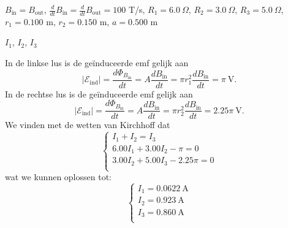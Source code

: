     \begin{description}[labelwidth=1.5cm, leftmargin=!]
        \item[Geg. :] $B_{\text{in}} = B_{\text{out}}$, $\frac{d}{dt} B_{\text{in}} = \frac{d}{dt} B_{\text{out}} = 100$ T/s, $R_1 = 6.0 \ \Omega$, $R_2 = 3.0 \ \Omega$, $R_3 = 5.0 \ \Omega$, $r_1 = 0.100$ m, $r_2 = 0.150$ m, $a = 0.500$ m
        \item[Gevr. :] $I_1$, $I_2$, $I_3$
        \item[Opl. :]
            In de linkse lus is de geïnduceerde emf gelijk aan
            \begin{equation*}
                \left| \mathcal{E}_{\text{ind}} \right| =  \frac{d\Phi_{B_{\text{in}}}}{dt} = A\frac{dB_{\text{in}}}{dt} = \pi r_1^2 \frac{dB_{\text{in}}}{dt}  = \pi \ \text{V}.
            \end{equation*}
            In de rechtse lus is de geïnduceerde emf gelijk aan
            \begin{equation*}
                \left| \mathcal{E}_{\text{ind}} \right| =  \frac{d\Phi_{B_{\text{in}}}}{dt} = A\frac{dB_{\text{in}}}{dt} = \pi r_2^2 \frac{dB_{\text{in}}}{dt}  = 2.25\pi \ \text{V}.
            \end{equation*}
            We vinden met de wetten van Kirchhoff dat
            \begin{equation*}
                \begin{cases}
                    I_1 + I_2 = I_3 \\
                    6.00I_1 + 3.00I_2 - \pi = 0 \\
                    3.00I_2 + 5.00I_3 - 2.25\pi = 0 \\
                \end{cases}
            \end{equation*} 
            wat we kunnen oplossen tot:
            \begin{equation*}
                \begin{cases}
                    I_1 = 0.0622 \ \text{A} \\
                    I_2 = 0.923 \ \text{A} \\
                    I_3 = 0.860 \ \text{A} \\
                \end{cases}
            \end{equation*}
    \end{description}


\vspace{1cm}